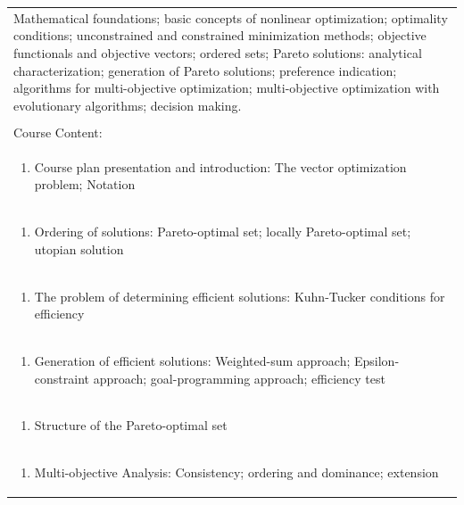 \documentclass[11pt]{article}
\begin{document}
\begin{center}
\begin{longtable}{|p{4cm}|p{4cm}|p{4cm}|p{4cm}|}
\multicolumn{4}{|p{\dimexpr 16cm + 6\tabcolsep\relax}|}{Mathematical foundations; basic concepts of nonlinear optimization; optimality conditions; unconstrained and constrained minimization methods; objective functionals and objective vectors; ordered sets; Pareto solutions: analytical characterization; generation of Pareto solutions; preference indication; algorithms for multi-objective optimization; multi-objective optimization with evolutionary algorithms; decision making.}\\
\multicolumn{4}{|p{16cm}|}{}\\
\hline
\multicolumn{4}{|p{16cm}|}{Course Content:}\\*
\multicolumn{4}{|p{\dimexpr 16cm + 6\tabcolsep\relax}|}{\begin{enumerate}[start=1]\item Course plan presentation and introduction: The vector optimization problem; Notation\end{enumerate}}\\
\multicolumn{4}{|p{\dimexpr 16cm + 6\tabcolsep\relax}|}{\begin{enumerate}[start=2]\item Ordering of solutions: Pareto-optimal set; locally Pareto-optimal set; utopian solution\end{enumerate}}\\
\multicolumn{4}{|p{\dimexpr 16cm + 6\tabcolsep\relax}|}{\begin{enumerate}[start=3]\item The problem of determining efficient solutions: Kuhn-Tucker conditions for efficiency\end{enumerate}}\\
\multicolumn{4}{|p{\dimexpr 16cm + 6\tabcolsep\relax}|}{\begin{enumerate}[start=4]\item Generation of efficient solutions: Weighted-sum approach; Epsilon-constraint approach; goal-programming approach; efficiency test\end{enumerate}}\\
\multicolumn{4}{|p{\dimexpr 16cm + 6\tabcolsep\relax}|}{\begin{enumerate}[start=5]\item Structure of the Pareto-optimal set\end{enumerate}}\\
\multicolumn{4}{|p{\dimexpr 16cm + 6\tabcolsep\relax}|}{\begin{enumerate}[start=6]\item Multi-objective Analysis: Consistency; ordering and dominance; extension\end{enumerate}}\\

\end{longtable}
\end{center}
\end{document}
